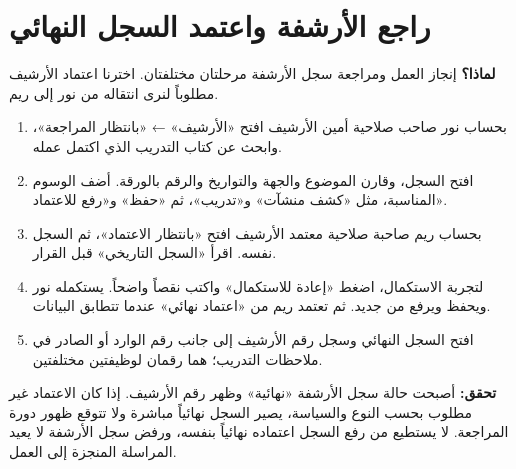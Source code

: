 \section{راجع الأرشفة واعتمد السجل النهائي}
\label{sec:archive}
\textbf{لماذا؟} إنجاز العمل ومراجعة سجل الأرشفة مرحلتان مختلفتان. اخترنا اعتماد الأرشيف مطلوباً لنرى انتقاله من نور إلى ريم.
\begin{enumerate}
\item بحساب نور صاحب صلاحية أمين الأرشيف افتح «الأرشيف» ← «بانتظار المراجعة»، وابحث عن كتاب التدريب الذي اكتمل عمله.
\item افتح السجل، وقارن الموضوع والجهة والتواريخ والرقم بالورقة. أضف الوسوم المناسبة، مثل «كشف منشآت» و«تدريب»، ثم «حفظ» و«رفع للاعتماد».
\item بحساب ريم صاحبة صلاحية معتمد الأرشيف افتح «بانتظار الاعتماد»، ثم السجل نفسه. اقرأ «السجل التاريخي» قبل القرار.
\item لتجربة الاستكمال، اضغط «إعادة للاستكمال» واكتب نقصاً واضحاً. يستكمله نور ويحفظ ويرفع من جديد. ثم تعتمد ريم من «اعتماد نهائي» عندما تتطابق البيانات.
\item افتح السجل النهائي وسجل رقم الأرشيف إلى جانب رقم الوارد أو الصادر في ملاحظات التدريب؛ هما رقمان لوظيفتين مختلفتين.
\end{enumerate}
\textbf{تحقق:} أصبحت حالة سجل الأرشفة «نهائية» وظهر رقم الأرشيف. إذا كان الاعتماد غير مطلوب بحسب النوع والسياسة، يصير السجل نهائياً مباشرة ولا تتوقع ظهور دورة المراجعة. لا يستطيع من رفع السجل اعتماده نهائياً بنفسه، ورفض سجل الأرشفة لا يعيد المراسلة المنجزة إلى العمل.

